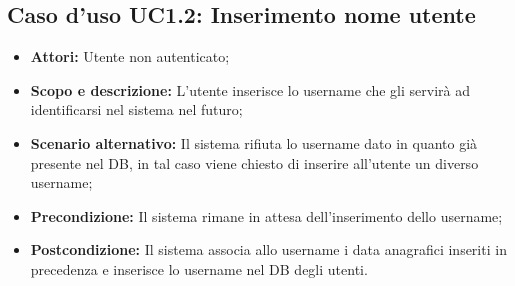 \documentclass[12pt,a4paper,titlepage]{article}
\begin{document}
	\subsection{Caso d'uso UC1.2: Inserimento nome utente}
	\label{UC1.2}
	\begin{itemize}
		\item \textbf{Attori: }Utente non autenticato;
		\item \textbf{Scopo e descrizione: }L'utente inserisce lo username che gli servirà ad identificarsi nel sistema nel futuro;
		\item \textbf{Scenario alternativo: }Il sistema rifiuta lo username dato in quanto già presente nel DB, in tal caso viene chiesto di inserire all'utente un diverso username;
		\item \textbf{Precondizione: }Il sistema rimane in attesa dell'inserimento dello username;
		\item \textbf{Postcondizione: }Il sistema associa allo username i data anagrafici inseriti in precedenza e inserisce lo username nel DB degli utenti.
	\end{itemize}
\end{document}
